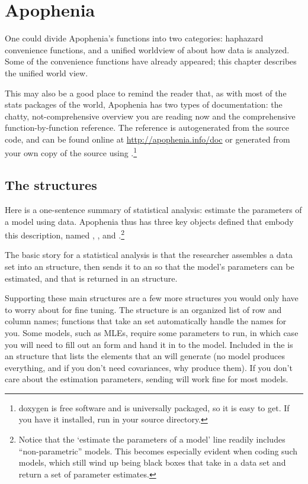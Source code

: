 \chapter{Apophenia} \label{apop}

One could divide Apophenia's functions into two categories: haphazard
convenience functions, and a unified worldview of about how data is
analyzed. Some of the convenience functions have already appeared; this
chapter describes the unified world view. 

This may also be a good place to remind the reader that, as with most of
the stats packages of the world, Apophenia has two types of
documentation: the chatty, not-comprehensive overview you are reading now and the
comprehensive function-by-function reference. The reference is autogenerated from the
source code, and can be found online at \url{http://apophenia.info/doc}
or generated from your own copy of the source using .\footnote{doxygen is free software and is universally packaged,
so it is easy to get. If you have it installed, run  in
your source directory.}

\section{The structures}
Here is a one-sentence summary of statistical analysis: estimate the
parameters of a model
using data. Apophenia thus has three key objects defined that embody
this description, named , , and 
.\footnote{Notice that the `estimate the parameters of a
model' line readily includes ``non-parametric'' models. This becomes
especially evident when coding such models, which still wind up being
black boxes that take in a data set and return a set of parameter
estimates.}

The basic story for a statistical analysis is that the researcher
assembles a data set into an  structure, then sends it to
an  so that the model's parameters can be estimated,
and that is returned in an  structure.

Supporting these main structures are a few more structures you would only
have to worry about for fine tuning.  The  structure is
an organized list of row and column names; functions that take an 
 set automatically handle the names for you. 
Some models, such as MLEs, require some parameters to run, in
which case you will need to fill out an 
form and hand it in to the model. Included in the
 is an
 structure that lists the elements
that an  will generate (no model produces
everything, and if you don't need covariances, why produce them). If you
don't care about the estimation parameters, sending  will
work fine for most models. 

